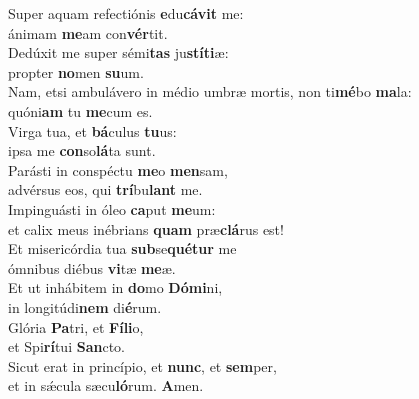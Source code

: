 \evenverse Super aquam refectiónis \textbf{e}du\textbf{cá}\textbf{vit} me:~\*\\
\evenverse ánimam \textbf{me}am con\textbf{vér}tit.\\
\oddverse Dedúxit me super sémi\textbf{tas} ju\textbf{stí}\textbf{ti}æ:~\*\\
\oddverse propter \textbf{no}men \textbf{su}um.\\
\evenverse Nam, etsi ambulávero in médio umbræ mortis, non ti\textbf{mé}bo \textbf{ma}la:~\*\\
\evenverse quóni\textbf{am} tu \textbf{me}cum es.\\
\oddverse Virga tua, et \textbf{bá}culus \textbf{tu}us:~\*\\
\oddverse ipsa me \textbf{con}so\textbf{lá}ta sunt.\\
\evenverse Parásti in conspéctu \textbf{me}o \textbf{men}sam,~\*\\
\evenverse advérsus eos, qui \textbf{trí}bu\textbf{lant} me.\\
\oddverse Impinguásti in óleo \textbf{ca}put \textbf{me}um:~\*\\
\oddverse et calix meus inébrians \textbf{quam} præ\textbf{clá}rus est!\\
\evenverse Et misericórdia tua \textbf{sub}se\textbf{qué}\textbf{tur} me~\*\\
\evenverse ómnibus diébus \textbf{vi}tæ \textbf{me}æ.\\
\oddverse Et ut inhábitem in \textbf{do}mo \textbf{Dó}\textbf{mi}ni,~\*\\
\oddverse in longitúdi\textbf{nem} di\textbf{é}rum.\\
\evenverse Glória \textbf{Pa}tri, et \textbf{Fí}\textbf{li}o,~\*\\
\evenverse et Spi\textbf{rí}tui \textbf{San}cto.\\
\oddverse Sicut erat in princípio, et \textbf{nunc}, et \textbf{sem}per,~\*\\
\oddverse et in sǽcula sæcu\textbf{ló}rum. \textbf{A}men.\\
